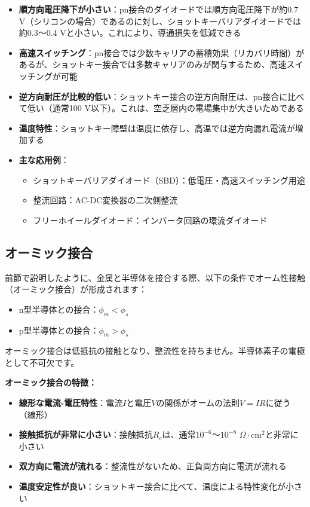 \begin{itemize}
\item \textbf{順方向電圧降下が小さい}：pn接合のダイオードでは順方向電圧降下が約0.7 V（シリコンの場合）であるのに対し、ショットキーバリアダイオードでは約0.3〜0.4 Vと小さい。これにより、導通損失を低減できる

\item \textbf{高速スイッチング}：pn接合では少数キャリアの蓄積効果（リカバリ時間）があるが、ショットキー接合では多数キャリアのみが関与するため、高速スイッチングが可能

\item \textbf{逆方向耐圧が比較的低い}：ショットキー接合の逆方向耐圧は、pn接合に比べて低い（通常100 V以下）。これは、空乏層内の電場集中が大きいためである

\item \textbf{温度特性}：ショットキー障壁は温度に依存し、高温では逆方向漏れ電流が増加する

\item \textbf{主な応用例}：
\begin{itemize}
\item ショットキーバリアダイオード（SBD）：低電圧・高速スイッチング用途
\item 整流回路：AC-DC変換器の二次側整流
\item フリーホイールダイオード：インバータ回路の環流ダイオード
\end{itemize}
\end{itemize}

\subsection{オーミック接合}

前節で説明したように、金属と半導体を接合する際、以下の条件でオーム性接触（オーミック接合）が形成されます：
\begin{itemize}
\item n型半導体との接合：$\phi_m < \phi_s$
\item p型半導体との接合：$\phi_m > \phi_s$
\end{itemize}

オーミック接合は低抵抗の接触となり、整流性を持ちません。半導体素子の電極として不可欠です。

\textbf{オーミック接合の特徴：}

\begin{itemize}
\item \textbf{線形な電流-電圧特性}：電流$I$と電圧$V$の関係がオームの法則$V = IR$に従う（線形）

\item \textbf{接触抵抗が非常に小さい}：接触抵抗$R_c$は、通常$10^{-6}$〜$10^{-8}$ $\Omega \cdot$cm$^2$と非常に小さい

\item \textbf{双方向に電流が流れる}：整流性がないため、正負両方向に電流が流れる

\item \textbf{温度安定性が良い}：ショットキー接合に比べて、温度による特性変化が小さい
\end{itemize}

